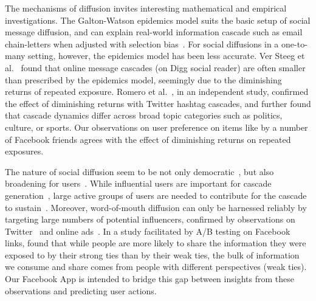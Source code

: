 The mechanisms of diffusion invites interesting mathematical and empirical investigations. 
The Galton-Watson epidemics model suits the basic setup of social
message diffusion, and can explain real-world information cascade such as
email chain-letters when adjusted with selection
bias~\cite{Golub2010selectionbiase}. For social diffusions in a
one-to-many setting, however, the epidemics model has been less
accurate. Ver Steeg et al.~\cite{ver2011stops} found that online message cascades (on
Digg social reader) are often smaller than prescribed by the epidemics
model, seemingly due to the diminishing returns of repeated
exposure. Romero et al.~\cite{Romero2011hashtag}, in an independent study, confirmed
the effect of diminishing returns with Twitter hashtag cascades, and
further found that cascade dynamics differ across broad topic
categories such as politics, culture, or sports. 
Our observations on user preference on items like by a number of Facebook friends agrees with the effect of diminishing returns on repeated exposures.

The nature of social diffusion seem to be not only democratic~\cite{asur2011trends,Bakshy2011everyone}, but also broadening for users~\cite{Bakshy2012chamber}. While influential users are important for cascade generation~\cite{Bakshy2011everyone}, large active groups of users are needed to contribute for the cascade to sustain~\cite{asur2011trends}. Moreover, word-of-mouth diffusion can only be harnessed reliably by targeting large numbers of potential influencers, confirmed by observations on Twitter~\cite{Bakshy2011everyone} and online ads~\cite{influence}. In a study facilitated by A/B testing on Facebook links, \cite{Bakshy2012chamber} found that while people are more likely to share the information they were exposed to by their strong ties than by their weak ties, the bulk of information we consume and share comes from people with different perspectives (weak ties). Our Facebook App is intended to bridge this gap between insights from these observations and predicting user actions.

